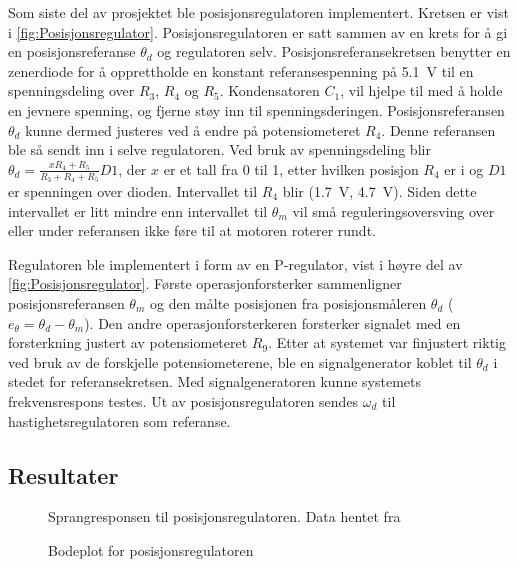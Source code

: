 Som siste del av prosjektet ble posisjonsregulatoren implementert. Kretsen er vist i \autoref{fig:Posisjonsregulator}. Posisjonsregulatoren er satt sammen av en krets for å gi en posisjonsreferanse $\theta_d$ og regulatoren selv.
Posisjonsreferansekretsen benytter en zenerdiode for å opprettholde en konstant referansespenning på {\SI{5.1}{\volt}} til en spenningsdeling over $R_3$, $R_4$ og $R_5$. Kondensatoren $C_1$, vil hjelpe til med å holde en jevnere spenning, og fjerne støy inn til spenningsderingen. Posisjonsreferansen $\theta_d$ kunne dermed justeres ved å endre på potensiometeret $R_4$. Denne referansen ble så sendt inn i selve regulatoren. Ved bruk av spenningsdeling blir $\theta_d = \frac{x R_4 + R_5}{R_3 + R_4 + R_5} D1$, der $x$ er et tall fra 0 til 1, etter hvilken posisjon $R_4$ er i og $D1$ er spenningen over dioden. Intervallet til $R_4$ blir (\SI{1.7}{\volt}, \SI{4.7}{\volt}). Siden dette intervallet er litt mindre enn intervallet til $\theta_m$ vil små reguleringsoversving over eller under referansen ikke føre til at motoren roterer rundt.

Regulatoren ble implementert i form av en P-regulator, vist i høyre del av \autoref{fig:Posisjonsregulator}. Første operasjonforsterker sammenligner posisjonsreferansen $\theta_m$ og den målte posisjonen fra posisjonsmåleren $\theta_d$ ($e_{\theta} = \theta_d - \theta_m$). Den andre operasjonforsterkeren forsterker signalet med en forsterkning justert av potensiometeret $R_9$. Etter at systemet var finjustert riktig ved bruk av de forskjelle potensiometerene, ble en signalgenerator koblet til $\theta_d$ i stedet for referansekretsen. Med signalgeneratoren kunne systemets frekvensrespons testes.
Ut av posisjonsregulatoren sendes $\omega_d$ til hastighetsregulatoren som referanse.


\subsection{Resultater}

\begin{figure}[h]
    \centering
    
    \caption{Sprangresponsen til posisjonsregulatoren. Data hentet fra \cite{EksempelData}}
    \label{fig:posisjon_P_regulator}
\end{figure}

\begin{figure}[h]
    \centering
    
    \caption{Bodeplot for posisjonsregulatoren}
    \label{fig:bodeplot}
\end{figure}

